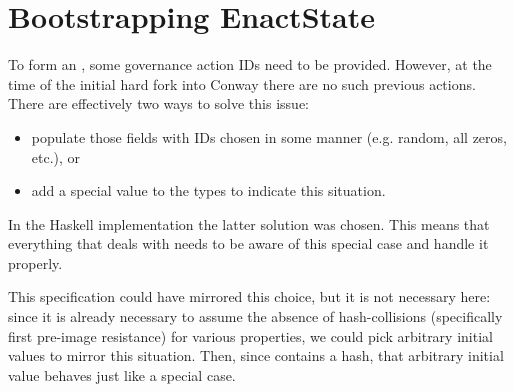 \section{Bootstrapping EnactState}
\label{sec:conway-bootstrap-enact}

To form an \EnactState{}, some governance action IDs need to be
provided. However, at the time of the initial hard fork into Conway
there are no such previous actions. There are effectively two ways to
solve this issue:

\begin{itemize}
\item populate those fields with IDs chosen in some manner (e.g. random, all zeros, etc.), or
\item add a special value to the types to indicate this situation.
\end{itemize}

In the Haskell implementation the latter solution was chosen. This
means that everything that deals with \GovActionID{} needs to be aware
of this special case and handle it properly.

This specification could have mirrored this choice, but it is not
necessary here: since it is already necessary to assume the absence of
hash-collisions (specifically first pre-image resistance) for various
properties, we could pick arbitrary initial values to mirror this
situation. Then, since \GovActionID{} contains a hash, that arbitrary
initial value behaves just like a special case.
